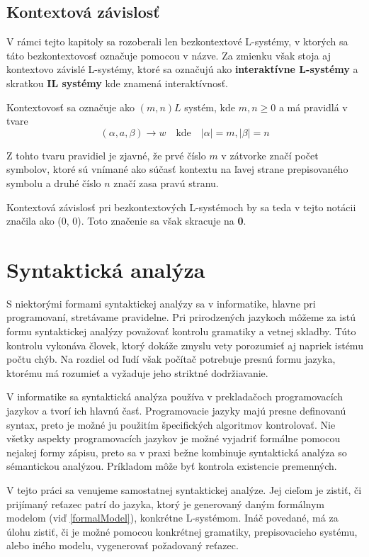 \section{Kontextová závislosť}
V rámci tejto kapitoly sa rozoberali len bezkontextové L-systémy, v ktorých sa táto bezkontextovosť označuje pomocou  v názve. Za zmienku však stoja aj kontextovo závislé L-systémy, ktoré sa označujú ako \textbf{interaktívne L-systémy} a skratkou \textbf{IL systémy} kde  znamená interaktívnosť. 

Kontextovosť sa označuje ako $(m, n)L$ systém, kde $m, n \geq 0$ a má pravidlá v tvare\cite{handbook}
\[ (\alpha, a, \beta) \to w \quad\text{kde}\quad |\alpha|=m, |\beta|=n \]

Z tohto tvaru pravidiel je zjavné, že prvé číslo $m$ v zátvorke značí počet symbolov, ktoré sú vnímané ako súčasť kontextu na ľavej strane prepisovaného symbolu a druhé číslo $n$ značí zasa pravú stranu.

Kontextová závislosť pri bezkontextových L-systémoch by sa teda v tejto notácii značila ako (0, 0). Toto značenie sa však skracuje na \textbf{0}.

\chapter{Syntaktická analýza} 
\label{syntax}

S niektorými formami syntaktickej analýzy sa v informatike, hlavne pri programovaní, stretávame pravidelne. Pri prirodzených jazykoch môžeme za istú formu syntaktickej analýzy považovať kontrolu gramatiky a vetnej skladby. Túto kontrolu vykonáva človek, ktorý dokáže zmyslu vety porozumieť aj napriek istému počtu chýb. Na rozdiel od ľudí však počítač potrebuje presnú formu jazyka, ktorému má rozumieť a vyžaduje jeho striktné dodržiavanie.

V informatike sa syntaktická analýza používa v prekladačoch programovacích jazykov a tvorí ich hlavnú časť. Programovacie jazyky majú presne definovanú syntax, preto je možné ju použitím špecifických algoritmov kontrolovať. Nie všetky aspekty programovacích jazykov je možné vyjadriť formálne pomocou nejakej formy zápisu, preto sa v praxi bežne kombinuje syntaktická analýza so sémantickou analýzou. Príkladom môže byť kontrola existencie premenných.

V tejto práci sa venujeme samostatnej syntaktickej analýze. Jej cieľom je zistiť, či prijímaný reťazec patrí do jazyka, ktorý je generovaný daným formálnym modelom (viď \ref{formalModel}), konkrétne L-systémom. Ináč povedané, má za úlohu zistiť, či je možné pomocou konkrétnej gramatiky, prepisovacieho systému, alebo iného modelu, vygenerovať požadovaný reťazec.

